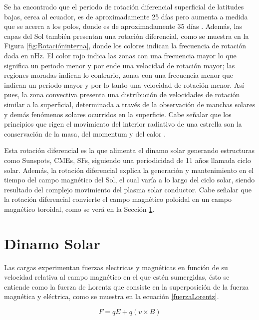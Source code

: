 Se ha encontrado que el periodo de rotación diferencial superficial de latitudes bajas, cerca al ecuador, es de aproximadamente 25 días pero aumenta a medida que se acerca a los polos, donde es de aproximadamente 35 días \parencite[e.g.,][]{thompson-2003}. Además, las capas del Sol también presentan una rotación diferencial, como se muestra en la Figura \ref{fig:Rotacióninterna}, donde los colores indican la frecuencia de rotación dada en nHz. El color rojo indica las zonas con una frecuencia mayor lo que significa un periodo menor y por ende una velocidad de rotación mayor; las regiones moradas indican lo contrario, zonas con una frecuencia menor que indican un periodo mayor y por lo tanto una velocidad de rotación menor. Así pues, la zona convectiva presenta una distribución de velocidades de rotación similar a la superficial, determinada a través de la observación de manchas solares y demás fenómenos solares ocurridos en la superficie. Cabe señalar que los principios que rigen el movimiento del interior radiativo de una estrella son la conservación de la masa, del momentum y del calor \parencite[e.g.,][]{spiegel-1992}.

Esta rotación diferencial es la que alimenta el dinamo solar generando estructuras como \ac{Sunspots}, \acp{CME}, \acp{SF}, siguiendo una periodicidad de 11 años llamada ciclo solar. Además, la rotación diferencial explica la generación y mantenimiento en el tiempo del campo magnético del Sol, el cual varía a lo largo del ciclo solar, siendo resultado del complejo movimiento del plasma solar conductor. Cabe señalar que la rotación diferencial convierte el campo magnético poloidal en un campo magnético toroidal, como se verá en la Sección \ref{Dinamo Solar}.

\section{Dinamo Solar}
\label{Dinamo Solar}
Las cargas experimentan fuerzas electricas y magnéticas en función de su velocidad relativa al campo magnético en el que estén sumergidas, ésto se entiende como la fuerza de Lorentz que consiste en la superposición de la fuerza magnética y eléctrica, como se muestra en la ecuación \eqref{fuerzaLorentz}.

\begin{equation}
F=qE + q(v \times B)
\label{fuerzaLorentz}
\end{equation} 

